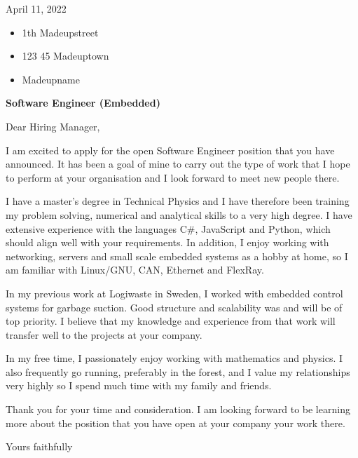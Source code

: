 April 11, 2022

\begin{itemize}
	\item 1th Madeupstreet
	\item 123 45 Madeuptown
	\item Madeupname
\end{itemize}

\bigskip

\textbf{Software Engineer (Embedded)}

Dear Hiring Manager,

I am excited to apply for the open Software Engineer position that you have announced. It has been a goal of mine to carry out the type of work that I hope to perform at your organisation and I look forward to meet new people there. 

I have a master's degree in Technical Physics and I have therefore been training my problem solving, numerical and analytical skills to a very high degree. I have extensive experience with the languages C\#, JavaScript and Python, which should align well with your requirements. In addition, I enjoy working with networking, servers and small scale embedded systems as a hobby at home, so I am familiar with Linux/GNU, CAN, Ethernet and FlexRay.

In my previous work at Logiwaste in Sweden, I worked with embedded control systems for garbage suction. Good structure and scalability was and will be of top priority. I believe that my knowledge and experience from that work will transfer well to the projects at your company.

In my free time, I passionately enjoy working with mathematics and physics. I also frequently go running, preferably in the forest, and I value my relationships very highly so I spend much time with my family and friends.

Thank you for your time and consideration. I am looking forward to be learning more about the position that you have open at your company your work there.

Yours faithfully



































